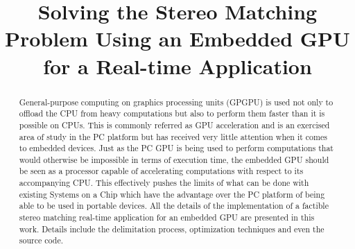 \documentclass[conference]{IEEEtran}
\begin{document}
\title{Solving the Stereo Matching Problem Using an Embedded GPU for a Real-time Application}

\author{



}

\maketitle

\begin{abstract}
General-purpose computing on graphics processing units (GPGPU) is used not only to offload the CPU from heavy computations but also to perform them faster than it is possible on CPUs. This is commonly referred as GPU acceleration and is an exercised area of study in the PC platform but has received very little attention when it comes to embedded devices. Just as the PC GPU is being used to perform computations that would otherwise be impossible in terms of execution time, the embedded GPU should be seen as a processor capable of accelerating computations with respect to its accompanying CPU. This effectively pushes the limits of what can be done with existing Systems on a Chip which have the advantage over the PC platform of being able to be used in portable devices. All the details of the implementation of a factible stereo matching real-time application for an embedded GPU are presented in this work. Details include the delimitation process, optimization techniques and even the source code.
\end{abstract}


\IEEEpeerreviewmaketitle
\end{document}
